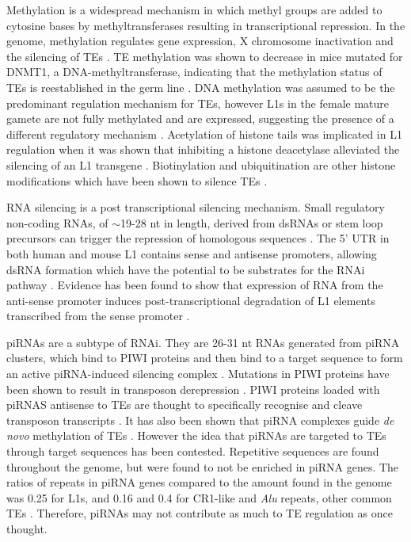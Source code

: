 \documentclass[12pt]{article}
\begin{document}
			Methylation is a widespread mechanism in which methyl groups are added to cytosine bases by methyltransferases resulting in transcriptional repression.
			In the genome, methylation regulates gene expression, X chromosome inactivation and the silencing of TEs \citep{EnLi14}.
			TE methylation was shown to decrease in mice mutated for DNMT1, a DNA-methyltransferase, indicating that the methylation status of TEs is reestablished in the germ line \citep{Okano99, Walsh98}.
			DNA methylation was assumed to be the predominant regulation mechanism for TEs, however L1s in the female mature gamete are not fully methylated and are expressed, suggesting the presence of a different regulatory mechanism \citep{Peaston04}.
			Acetylation of histone tails was implicated in L1 regulation when it was shown that inhibiting a histone deacetylase alleviated the silencing of an L1 transgene \citep{Garcia-Perez10}.
			Biotinylation and ubiquitination are other histone modifications which have been shown to silence TEs \citep{Chew08,Zempleni09, Sridhar07}. 

			RNA silencing is a post transcriptional silencing mechanism.
			Small regulatory non-coding RNAs, of $\sim$19-28 nt in length, derived from dsRNAs or stem loop precursors can trigger the repression of homologous sequences \citep{Obbard09}.
			The 5' UTR in both human and mouse L1 contains sense and antisense promoters, allowing dsRNA formation which have the potential to be substrates for the RNAi pathway \citep{JingfengLi14,Matlik06}.
			Evidence has been found to show that expression of RNA from the anti-sense promoter induces post-transcriptional degradation of L1 elements transcribed from the sense promoter \citep{Yang06}. 
			
			piRNAs are a subtype of RNAi.
			They are 26-31 nt RNAs generated from piRNA clusters, which bind to PIWI proteins and then bind to a target sequence to form an active piRNA-induced silencing complex \citep{Bodak14,Castaneda11, Siomi11}.
			Mutations in PIWI proteins have been shown to result in transposon derepression \citep{Kalmykova05,Vagin04}. 
			PIWI proteins loaded with piRNAS antisense to TEs are thought to specifically recognise and cleave transposon transcripts \citep{Brennecke07,Gunawardane07}.
			It has also been shown that piRNA complexes guide \textit{de novo} methylation of TEs \citep{Aravin07,Kuramochi08}.
			However the idea that piRNAs are targeted to TEs through target sequences has been contested.
			Repetitive sequences are found throughout the genome, but were found to not be enriched in piRNA genes.
			The ratios of repeats in piRNA genes compared to the amount found in the genome was 0.25 for L1s, and 0.16 and 0.4 for CR1-like and \textit{Alu} repeats, other common TEs \citep{Williams15}.
			Therefore, piRNAs may not contribute as much to TE regulation as once thought.
			
\end{document}
